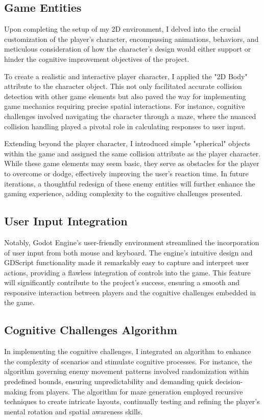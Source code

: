 \documentclass[10pt,twocolumn]{article}
\begin{document}
\subsection{Game Entities}
Upon completing the setup of my 2D environment, I delved into the crucial customization of the player's character, encompassing animations, behaviors, and meticulous consideration of how the character's design would either support or hinder the cognitive improvement objectives of the project.

To create a realistic and interactive player character, I applied the "2D Body" attribute to the character object. This not only facilitated accurate collision detection with other game elements but also paved the way for implementing game mechanics requiring precise spatial interactions. For instance, cognitive challenges involved navigating the character through a maze, where the nuanced collision handling played a pivotal role in calculating responses to user input.

Extending beyond the player character, I introduced simple "spherical" objects within the game and assigned the same collision attribute as the player character. While these game elements may seem basic, they serve as obstacles for the player to overcome or dodge, effectively improving the user's reaction time. In future iterations, a thoughtful redesign of these enemy entities will further enhance the gaming experience, adding complexity to the cognitive challenges presented.
\subsection{User Input Integration}
Notably, Godot Engine's user-friendly environment streamlined the incorporation of user input from both mouse and keyboard. The engine's intuitive design and GDScript functionality made it remarkably easy to capture and interpret user actions, providing a flawless integration of controls into the game. This feature will significantly contribute to the project's success, ensuring a smooth and responsive interaction between players and the cognitive challenges embedded in the game.
\subsection{Cognitive Challenges Algorithm}
In implementing the cognitive challenges, I integrated an algorithm to enhance the complexity of scenarios and stimulate cognitive processes. For instance, the algorithm governing enemy movement patterns involved randomization within predefined bounds, ensuring unpredictability and demanding quick decision-making from players. The algorithm for maze generation employed recursive techniques to create intricate layouts, continually testing and refining the player's mental rotation and spatial awareness skills.
\end{document}

